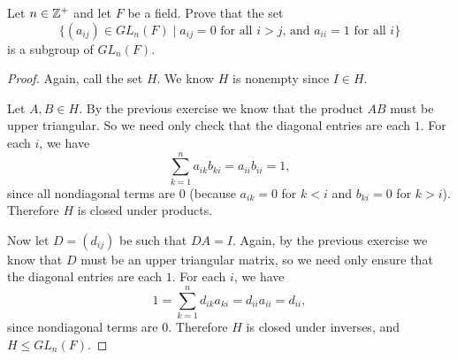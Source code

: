  Let $n\in\mathbb{Z}^+$ and let $F$ be a field. Prove that the
set
\begin{equation*}
  \{(a_{ij})\in GL_n(F) \mid \text{$a_{ij} = 0$ for all $i > j$,
    and $a_{ii} = 1$ for all $i$}\}
\end{equation*}
is a subgroup of $GL_n(F)$.
\begin{proof}
  Again, call the set $H$. We know $H$ is nonempty since $I\in H$.

  Let $A,B\in H$. By the previous exercise we know that the product
  $AB$ must be upper triangular. So we need only check that the
  diagonal entries are each $1$. For each $i$, we have
  \begin{equation*}
    \sum_{k=1}^n a_{ik}b_{ki} = a_{ii}b_{ii} = 1,
  \end{equation*}
  since all nondiagonal terms are $0$ (because $a_{ik} = 0$ for
  $k < i$ and $b_{ki} = 0$ for $k > i$). Therefore $H$ is closed under
  products.

  Now let $D = (d_{ij})$ be such that $DA = I$. Again, by the previous
  exercise we know that $D$ must be an upper triangular matrix, so we
  need only ensure that the diagonal entries are each $1$. For each
  $i$, we have
  \begin{equation*}
    1 = \sum_{k=1}^n d_{ik}a_{ki} = d_{ii}a_{ii} = d_{ii},
  \end{equation*}
  since nondiagonal terms are $0$. Therefore $H$ is closed under
  inverses, and $H\leq GL_n(F)$.
\end{proof}
